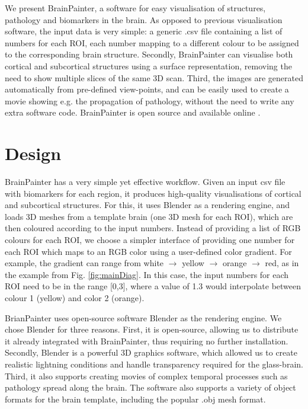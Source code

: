 \documentclass{llncs}
\begin{document}
We present BrainPainter, a software for easy visualisation of structures, pathology and biomarkers in the brain. As opposed to previous visualisation software, the input data is very simple: a generic .csv file containing a list of numbers for each ROI, each number mapping to a different colour to be assigned to the corresponding brain structure. Secondly, BrainPainter can visualise both cortical and subcortical structures using a surface representation, removing the need to show multiple slices of the same 3D scan. Third, the images are generated automatically from pre-defined view-points, and can be easily used to create a movie showing e.g. the propagation of pathology, without the need to write any extra software code. BrainPainter is open source and available online \cite{brainPainter}.


\FloatBarrier
\section{Design}
\label{design}



BrainPainter has a very simple yet effective workflow. Given an input csv file with biomarkers for each region, it produces high-quality visualisations of cortical and subcortical structures. For this, it uses Blender as a rendering engine, and loads 3D meshes from a template brain (one 3D mesh for each ROI), which are then coloured according to the input numbers. Instead of providing a list of RGB colours for each ROI, we choose a simpler interface of providing one number for each ROI which maps to an RGB color using a user-defined color gradient. For example, the gradient can range from white $\rightarrow$ yellow $\rightarrow$ orange $\rightarrow$ red, as in the example from Fig. \ref{fig:mainDiag}. In this case, the input numbers for each ROI need to be in the range [0,3], where a value of 1.3 would interpolate between colour 1 (yellow) and color 2 (orange).

BrianPainter uses open-source software Blender as the rendering engine. We chose Blender for three reasons. First, it is open-source, allowing us to distribute it already integrated with BrainPainter, thus requiring no further installation. Secondly, Blender is a powerful 3D graphics software, which allowed us to create realistic lightning conditions and handle transparency required for the glass-brain. Third, it also supports creating movies of complex temporal processes such as pathology spread along the brain. The software also supports a variety of object formats for the brain template, including the popular .obj mesh format.
\end{document}
